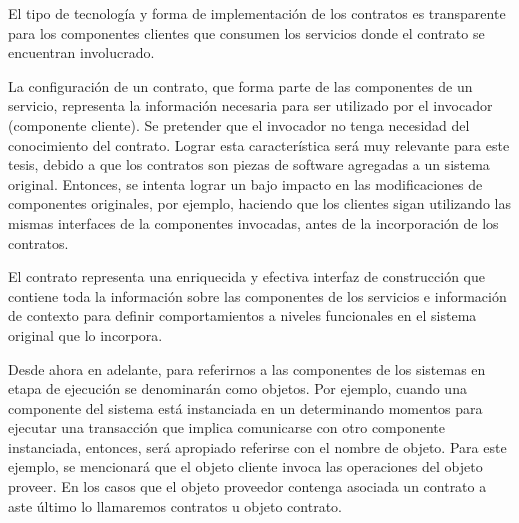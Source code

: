 



El tipo de tecnología y forma de implementación de los contratos es transparente para los componentes clientes que consumen los servicios donde el contrato se encuentran involucrado.

La configuración de un contrato, que forma parte de las componentes de un servicio, representa la información necesaria  para ser utilizado por el invocador (componente cliente). Se pretender que el invocador no tenga necesidad del conocimiento del contrato. Lograr esta característica será muy relevante para este tesis, debido a que los contratos son piezas de software agregadas a un sistema original. Entonces, se intenta lograr un bajo impacto en las modificaciones de componentes originales, por ejemplo, haciendo que los clientes sigan utilizando las mismas interfaces de la componentes invocadas, antes de la incorporación de los contratos. 

El contrato representa una enriquecida y efectiva interfaz de construcción que contiene toda la información sobre las componentes de los servicios e información de contexto para definir comportamientos a niveles funcionales en el sistema original que lo incorpora.

Desde ahora en adelante, para referirnos a las componentes de los sistemas en etapa de ejecución se denominarán como objetos. Por ejemplo, cuando una componente del sistema está instanciada en un determinando momentos para ejecutar una transacción que implica comunicarse con otro componente instanciada, entonces, será apropiado referirse con el nombre de objeto. Para este ejemplo, se mencionará que el objeto cliente invoca las operaciones del objeto proveer. En los casos que el objeto proveedor contenga asociada un contrato a aste último lo llamaremos contratos u objeto contrato.


